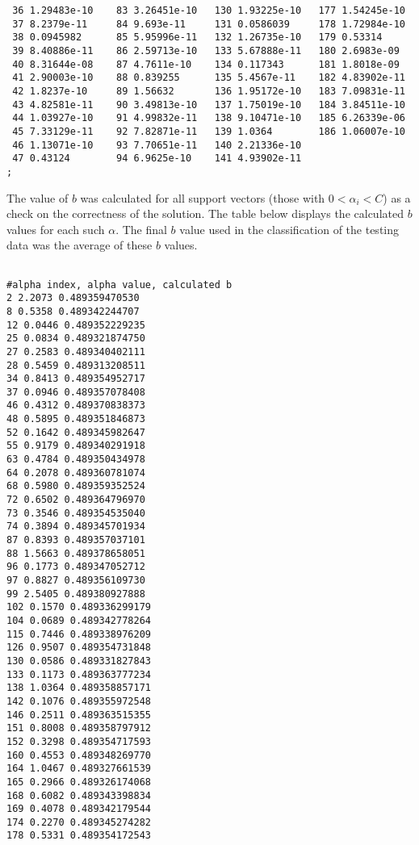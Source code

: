 \documentclass{article}
\begin{document}
\begin{verbatim}
 36 1.29483e-10    83 3.26451e-10   130 1.93225e-10   177 1.54245e-10
 37 8.2379e-11     84 9.693e-11     131 0.0586039     178 1.72984e-10
 38 0.0945982      85 5.95996e-11   132 1.26735e-10   179 0.53314
 39 8.40886e-11    86 2.59713e-10   133 5.67888e-11   180 2.6983e-09
 40 8.31644e-08    87 4.7611e-10    134 0.117343      181 1.8018e-09
 41 2.90003e-10    88 0.839255      135 5.4567e-11    182 4.83902e-11
 42 1.8237e-10     89 1.56632       136 1.95172e-10   183 7.09831e-11
 43 4.82581e-11    90 3.49813e-10   137 1.75019e-10   184 3.84511e-10
 44 1.03927e-10    91 4.99832e-11   138 9.10471e-10   185 6.26339e-06
 45 7.33129e-11    92 7.82871e-11   139 1.0364        186 1.06007e-10
 46 1.13071e-10    93 7.70651e-11   140 2.21336e-10
 47 0.43124        94 6.9625e-10    141 4.93902e-11
;

\end{verbatim}

The value of \(b\) was calculated for all support vectors (those with \(0 < \alpha_i < C\)) as a check on the correctness of the solution. The table below displays the calculated \(b\) values for each such \(\alpha\). The final \(b\) value used in the classification of the testing data was the average of these \(b\) values.

\begin{verbatim}

#alpha index, alpha value, calculated b
2 2.2073 0.489359470530
8 0.5358 0.489342244707
12 0.0446 0.489352229235
25 0.0834 0.489321874750
27 0.2583 0.489340402111
28 0.5459 0.489313208511
34 0.8413 0.489354952717
37 0.0946 0.489357078408
46 0.4312 0.489370838373
48 0.5895 0.489351846873
52 0.1642 0.489345982647
55 0.9179 0.489340291918
63 0.4784 0.489350434978
64 0.2078 0.489360781074
68 0.5980 0.489359352524
72 0.6502 0.489364796970
73 0.3546 0.489354535040
74 0.3894 0.489345701934
87 0.8393 0.489357037101
88 1.5663 0.489378658051
96 0.1773 0.489347052712
97 0.8827 0.489356109730
99 2.5405 0.489380927888
102 0.1570 0.489336299179
104 0.0689 0.489342778264
115 0.7446 0.489338976209
126 0.9507 0.489354731848
130 0.0586 0.489331827843
133 0.1173 0.489363777234
138 1.0364 0.489358857171
142 0.1076 0.489355972548
146 0.2511 0.489363515355
151 0.8008 0.489358797912
152 0.3298 0.489354717593
160 0.4553 0.489348269770
164 1.0467 0.489327661539
165 0.2966 0.489326174068
168 0.6082 0.489343398834
169 0.4078 0.489342179544
174 0.2270 0.489345274282
178 0.5331 0.489354172543

\end{verbatim}
\end{document}
